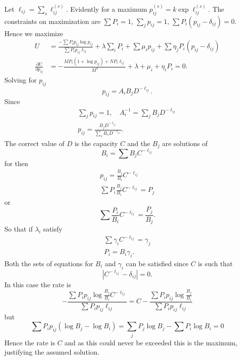 Let $\ell_{ij}=\sum_s\ell_{ij}^{(s)}$.  Evidently for a maximum
$p_{ij}^{(s)}=k\exp \ell_{ij}^{(s)}$.  The constraints on maximization are
$\sum P_i=1$, $\sum_j p_{ij}=1$, $\sum P_i(p_{ij}-\delta_{ij})=0$.
Hence we maximize
\begin{align*}
U&=\frac{-\sum P_i p_{ij}\log p_{ij}}{\sum P_i p_{ij} \ell_{ij}}
+\lambda\sum_i P_i+\sum\mu_i p_{ij}+\sum\eta_j P_i(p_{ij}-\delta_{ij})\\
\frac{\partial U}{\partial p_{ij}}&=
  -\frac{M P_i(1+\log p_{ij})+NP_i\ell_{ij}}{M^2}+\lambda+\mu_i+\eta_i P_i=0.
\end{align*}
Solving for $p_{ij}$
$$
p_{ij}=A_i B_j D^{-\ell_{ij}}.
$$
Since
\begin{gather*}
\sum_j p_{ij}=1,\quad A_i^{-1}=\sum_j B_j D^{-\ell_{ij}}\\
p_{ij}=\frac{B_j D^{-\ell_{ij}}}{\sum_s B_s D^{-\ell_{is}}}.
\end{gather*}
The correct value of $D$ is the capacity $C$ and the $B_j$ are solutions of
$$
B_i=\sum B_j C^{-\ell_{ij}}
$$
for then
\begin{gather*}
p_{ij}=\frac{B_j}{B_i}C^{-\ell_{ij}}\\
\sum P_i\frac{B_j}{B_i}C^{-\ell_{ij}}=P_j
\end{gather*}
or
$$
\sum \frac{P_i}{B_i}C^{-\ell_{ij}}=\frac{P_j}{B_j}.
$$
So that if $\lambda_i$ satisfy
\begin{gather*}
\sum\gamma_i C^{-\ell_{ij}} = \gamma_j\\
P_i=B_i\gamma_i.
\end{gather*}
Both the sets of equations for $B_i$ and $\gamma_i$ can be satisfied since
$C$ is such that
$$
|C^{-\ell_{ij}}-\delta_{ij}|=0.
$$
In this case the rate is
$$
-\frac{\sum P_ip_{ij}\log\frac{B_j}{B_i}C^{-\ell_{ij}}}
  {\sum P_ip_{ij}\ell_{ij}}
=C-\frac{\sum P_ip_{ij}\log\frac{B_j}{B_i}}{\sum P_ip_{ij}\ell_{ij}}
$$
but
$$
\sum P_i p_{ij}(\log B_j-\log B_i)=\sum_j P_j\log B_j-\sum P_i\log B_i=0
$$
Hence the rate is $C$ and as this could never be exceeded this is the
maximum, justifying the assumed solution.

\endappendix
